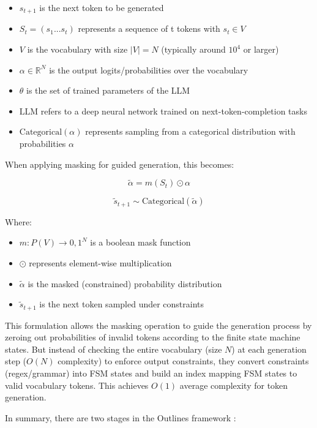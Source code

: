\begin{itemize}
    \item $s_{t+1}$ is the next token to be generated
    \item $S_t = (s_1...s_t)$ represents a sequence of t tokens with $s_t \in V$
    \item $V$ is the vocabulary with size $|V| = N$ (typically around $10^4$ or larger)
    \item $\alpha \in \mathbb{R}^N$ is the output logits/probabilities over the vocabulary
    \item $\theta$ is the set of trained parameters of the LLM
    \item $\text{LLM}$ refers to a deep neural network trained on next-token-completion tasks
    \item $\text{Categorical}(\alpha)$ represents sampling from a categorical distribution with probabilities $\alpha$
\end{itemize}

When applying masking for guided generation, this becomes:

\[\tilde{\alpha} = m(S_t) \odot \alpha\]

\[\tilde{s}_{t+1} \sim \text{Categorical}(\tilde{\alpha})\]

Where:

\begin{itemize}
    \item $m: P(V) \rightarrow {0,1}^N$ is a boolean mask function
    \item $\odot$ represents element-wise multiplication
    \item $\tilde{\alpha}$ is the masked (constrained) probability distribution
    \item $\tilde{s}_{t+1}$ is the next token sampled under constraints
\end{itemize}
This formulation allows the masking operation to guide the generation process by zeroing out probabilities of invalid tokens according to the finite state machine states. But instead of checking the entire vocabulary (size $N$) at each generation step ($O(N)$ complexity) to enforce output constraints, they convert constraints (regex/grammar) into FSM states and build an index mapping FSM states to valid vocabulary tokens. This achieves $O(1)$ average complexity for token generation.

In summary, there are two stages in the Outlines framework :

